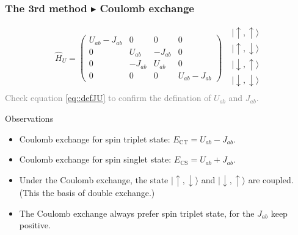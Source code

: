 \documentclass{beamer}
\begin{document}
  \begin{frame}
    \frametitle{The 3rd method \(\blacktriangleright\) Coulomb exchange}
    \begin{equation}
      \widehat{H}_U = \begin{pmatrix}
        U_{ab} - J_{ab} & 0 & 0 & 0\\
        0 & U_{ab} & -J_{ab} & 0 \\
        0 & -J_{ab} & U_{ab} & 0 \\
        0 & 0 & 0 & U_{ab} - J_{ab}
      \end{pmatrix}\ \ \ \begin{matrix}
        |\uparrow,\uparrow\rangle\\
        |\uparrow,\downarrow\rangle\\
        |\downarrow,\uparrow\rangle\\
        |\downarrow,\downarrow\rangle\\
      \end{matrix}
    \end{equation}
  \textcolor{gray}{Check equation \eqref{eq::defJU} to confirm the defination of \(U_{ab}\) and \(J_{ab}\).}
    \begin{block}{Observations}
      \begin{itemize}
        \item Coulomb exchange for spin triplet state: \(E_{\text{CT}} = U_{ab} - J_{ab}\).
        \item Coulomb exchange for spin singlet state: \(E_{\text{CS}} = U_{ab} + J_{ab}\).
        \item Under the Coulomb exchange, the state \(|\uparrow,\downarrow\rangle\) and \(|\downarrow,\uparrow\rangle\) are coupled. (This the basis of double exchange.)
        \item The Coulomb exchange always prefer spin triplet state, for the \(J_{ab}\) keep positive. 
      \end{itemize}
    \end{block}
  \end{frame}
\end{document}
